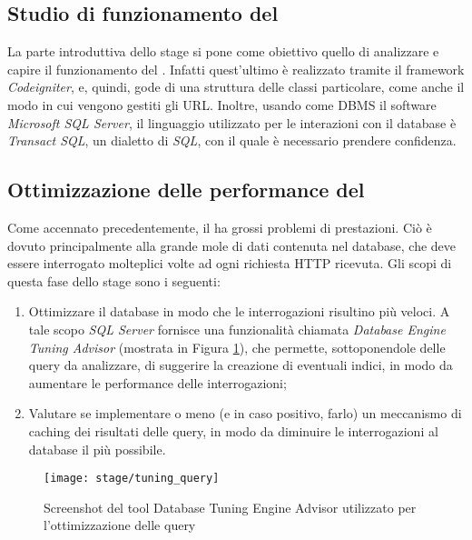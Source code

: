 \subsection{Studio di funzionamento del \bookingEngine}
La parte introduttiva dello stage si pone come obiettivo quello di analizzare e capire il funzionamento del \bookingEngine. Infatti quest'ultimo è realizzato tramite il \gls{framework} \textit{Codeigniter}, e, quindi, gode di una struttura delle classi particolare, come anche il modo in cui vengono gestiti gli URL. Inoltre, usando come \gls{DBMS} il software \textit{Microsoft SQL Server}, il linguaggio utilizzato per le interazioni con il database è \textit{Transact SQL}, un dialetto di \textit{SQL}, con il quale è necessario prendere confidenza.

\subsection{Ottimizzazione delle performance del \bookingEngine}
Come accennato precedentemente, il \bookingEngine\hphantom{i}ha grossi problemi di prestazioni. Ciò è dovuto principalmente alla grande mole di dati contenuta nel database, che deve essere interrogato molteplici volte ad ogni richiesta HTTP ricevuta. Gli scopi di questa fase dello stage sono i seguenti:
\begin{enumerate}
	\item Ottimizzare il database in modo che le interrogazioni risultino più veloci. A tale scopo \textit{SQL Server} fornisce una funzionalità chiamata \textit{Database Engine Tuning Advisor} (mostrata in Figura \ref{figura:database-tuning-engine}), che permette, sottoponendole delle query da analizzare, di suggerire la creazione di eventuali indici, in modo da aumentare le performance delle interrogazioni;
	\item Valutare se implementare o meno (e in caso positivo, farlo) un meccanismo di caching dei risultati delle query, in modo da diminuire le interrogazioni al database il più possibile.
\end{enumerate}

\begin{figure}[!h] 
	\centering 
	\texttt{[image: stage/tuning\_query]} 
	\caption{Screenshot del tool Database Tuning Engine Advisor utilizzato per l'ottimizzazione delle query}
	\label{figura:database-tuning-engine}
\end{figure}

